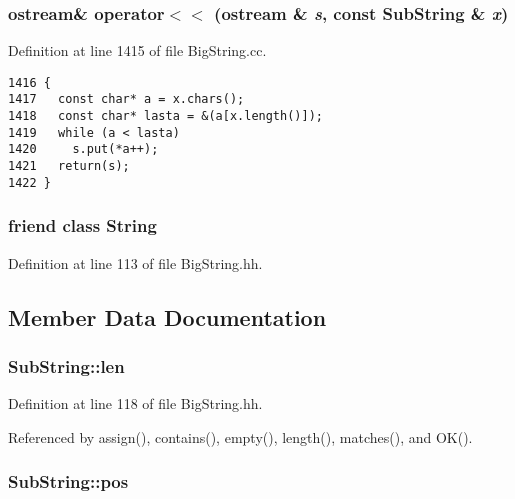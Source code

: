 \subsubsection{\setlength{\rightskip}{0pt plus 5cm}ostream\& operator$<$$<$ (ostream \& {\em s}, const Sub\-String \& {\em x})\hspace{0.3cm}{\tt  [friend]}}\label{classSubString_l1}




Definition at line 1415 of file Big\-String.cc.



\footnotesize\begin{verbatim}1416 { 
1417   const char* a = x.chars();
1418   const char* lasta = &(a[x.length()]);
1419   while (a < lasta)
1420     s.put(*a++);
1421   return(s);
1422 }
\end{verbatim}\normalsize 
{}
\subsubsection{\setlength{\rightskip}{0pt plus 5cm}friend class String\hspace{0.3cm}{\tt  [friend]}}\label{classSubString_l0}




Definition at line 113 of file Big\-String.hh.

\subsection{Member Data Documentation}
\subsubsection{ Sub\-String::len\hspace{0.3cm}{\tt  [protected]}}\label{classSubString_n2}




Definition at line 118 of file Big\-String.hh.

Referenced by assign(), contains(), empty(), length(), matches(), and OK().
\subsubsection{ Sub\-String::pos\hspace{0.3cm}{\tt  [protected]}}\label{classSubString_n1}




